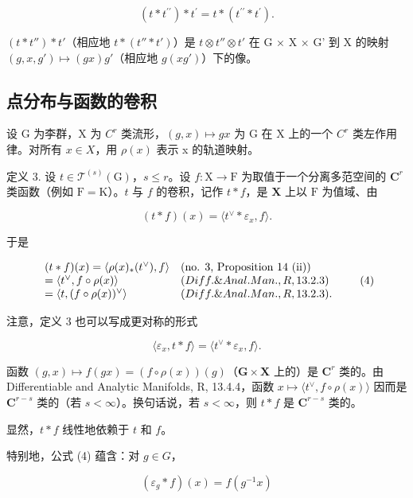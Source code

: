 \[
(t * t ^ {\prime \prime}) * t ^ {\prime} = t * (t ^ {\prime \prime} * t ^ {\prime}).
\]

\((t*t'')*t'\)（相应地 \(t*(t''*t')\)）是 \(t\otimes t''\otimes t'\) 在 G × X × G' 到 X 的映射 \((g,x,g')\mapsto(gx)g'\)（相应地 \(g(xg')\)）下的像。

\subsection{点分布与函数的卷积}

设 G 为李群，X 为 \(C^{r}\) 类流形，\((g, x) \mapsto gx\) 为 G 在 X 上的一个 \(C^{r}\) 类左作用律。对所有 \(x \in X\)，用 \(\rho(x)\) 表示 x 的轨道映射。

定义 3. 设 \(t \in \mathcal{T}^{(s)}(\mathrm{G})\)，\(s \leqslant r\)。设 \(f: \mathrm{X} \to \mathrm{F}\) 为取值于一个分离多范空间的 \(\mathbf{C}^r\) 类函数（例如 \(\mathrm{F} = \mathrm{K}\)）。\(t\) 与 \(f\) 的卷积，记作 \(t * f\)，是 \(\mathbf{X}\) 上以 \(\mathrm{F}\) 为值域、由

\[
(t * f) (x) = \langle t ^ {\vee} * \varepsilon_ {x}, f \rangle .
\]

于是

\[
\begin{array}{l l} (t * f) (x) = \langle \rho (x) _ {*} (t ^ {\vee}), f \rangle & (\text {no. 3, Proposition 14 (ii)}) \\ = \langle t ^ {\vee}, f \circ \rho (x) \rangle & (Diff. \& Anal. Man., R, 13.2.3) \\ = \langle t, (f \circ \rho (x)) ^ {\vee} \rangle & (Diff. \& Anal. Man., R, 13.2.3). \end{array}\tag{4}
\]

注意，定义 3 也可以写成更对称的形式

\[
\langle \varepsilon_ {x}, t * f \rangle = \langle t ^ {\vee} * \varepsilon_ {x}, f \rangle .\tag{5}
\]

函数 \((g,x)\mapsto f(gx) = (f\circ \rho (x))(g)\)（\(\mathbf{G}\times \mathbf{X}\) 上的）是 \(\mathbf{C}^r\) 类的。由 Differentiable and Analytic Manifolds, R, 13.4.4，函数 \(x\mapsto \langle t^\vee,f\circ \rho (x)\rangle\) 因而是 \(\mathbf{C}^{r - s}\) 类的（若 \(s < \infty\)）。换句话说，若 \(s < \infty\)，则 \(t*f\) 是 \(\mathbf{C}^{r - s}\) 类的。

显然，\(t * f\) 线性地依赖于 \(t\) 和 \(f\)。

特别地，公式 (4) 蕴含：对 \(g \in G\)，

\[
\left(\varepsilon_ {g} * f\right) (x) = f \left(g ^ {- 1} x\right)\tag{6}
\]


